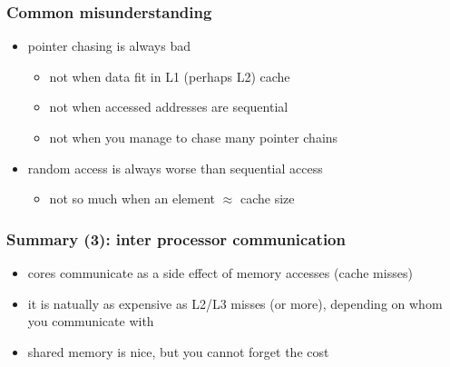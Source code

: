 \documentclass[12pt,dvipdfmx]{beamer}
\begin{document}
\begin{frame}
\frametitle{Common misunderstanding}

\begin{itemize}
\item pointer chasing is always bad
  \begin{itemize}
  \item not when data fit in L1 (perhaps L2) cache
  \item not when accessed addresses are sequential
  \item not when you manage to chase many pointer chains
  \end{itemize}

\item random access is always worse than sequential access
  \begin{itemize}
  \item not so much when an element $\approx$ cache size
  \end{itemize}
\end{itemize}

\end{frame}

\begin{frame}
\frametitle{Summary (3): inter processor communication}
\begin{itemize}
\item cores communicate as a side effect of memory accesses (cache misses)

\item it is natually as expensive as L2/L3 misses (or more), depending on 
  whom you communicate with

\item shared memory is nice, but you cannot forget the cost
\end{itemize}
\end{frame}
\end{document}
